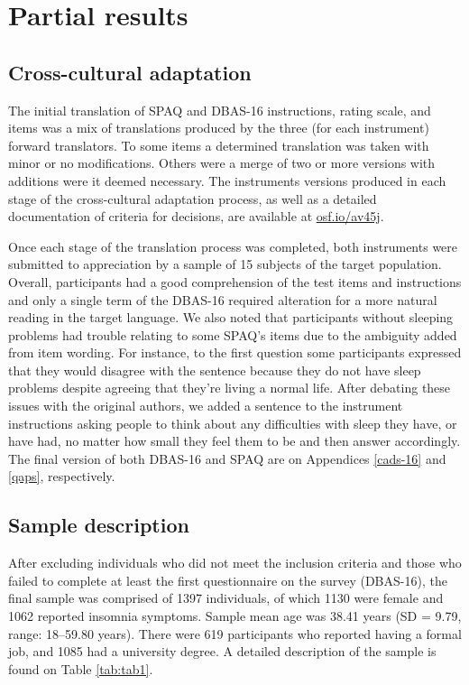 \documentclass[
  ,doc,11pt, twoside,floatsintext]{apa6}
\begin{document}
\hypertarget{partial-results}{%
\section{Partial results}\label{partial-results}}

\hypertarget{cross-cultural-adaptation}{%
\subsection{Cross-cultural adaptation}\label{cross-cultural-adaptation}}

The initial translation of SPAQ and DBAS-16 instructions, rating scale, and items was a mix of translations produced by the three (for each instrument) forward translators. To some items a determined translation was taken with minor or no modifications. Others were a merge of two or more versions with additions were it deemed necessary. The instruments versions produced in each stage of the cross-cultural adaptation process, as well as a detailed documentation of criteria for decisions, are available at \href{https://osf.io/av45j/}{osf.io/av45j}.

Once each stage of the translation process was completed, both instruments were submitted to appreciation by a sample of 15 subjects of the target population. Overall, participants had a good comprehension of the test items and instructions and only a single term of the DBAS-16 required alteration for a more natural reading in the target language. We also noted that participants without sleeping problems had trouble relating to some SPAQ's items due to the ambiguity added from item wording. For instance, to the first question some participants expressed that they would disagree with the sentence because they do not have sleep problems despite agreeing that they're living a normal life. After debating these issues with the original authors, we added a sentence to the instrument instructions asking people to think about any difficulties with sleep they have, or have had, no matter how small they feel them to be and then answer accordingly. The final version of both DBAS-16 and SPAQ are on Appendices \ref{cads-16} and \ref{qaps}, respectively.

\hypertarget{sample-description}{%
\subsection{Sample description}\label{sample-description}}

After excluding individuals who did not meet the inclusion criteria and those who failed to complete at least the first questionnaire on the survey (DBAS-16), the final sample was comprised of 1397 individuals, of which 1130 were female and 1062 reported insomnia symptoms. Sample mean age was 38.41 years (SD = 9.79, range: 18--59.80 years). There were 619 participants who reported having a formal job, and 1085 had a university degree. A detailed description of the sample is found on Table \ref{tab:tab1}.
\end{document}
